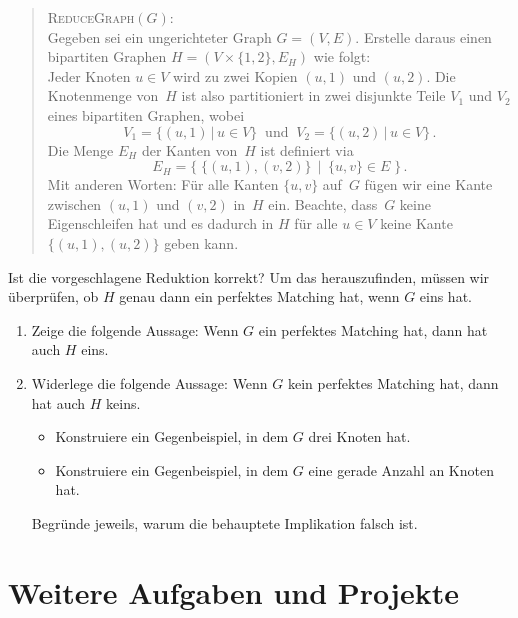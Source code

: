 \documentclass{uebung_cs}
\begin{document}
\begin{exercise}
	\begin{quote}
		\textsc{ReduceGraph}$(G)$:\\
		Gegeben sei ein ungerichteter Graph $G = (V,E)$. Erstelle daraus einen bipartiten Graphen $H = (V \times \{1,2\},E_H)$ wie folgt:\\
		Jeder Knoten $u \in V$ wird zu zwei Kopien $(u,1)$ und $(u,2)$. Die Knotenmenge von~$H$ ist also partitioniert in zwei disjunkte Teile $V_1$ und $V_2$ eines bipartiten Graphen, wobei
		\begin{equation*}
			V_1 = \{(u,1)\,|\,u\in V\}\ \text{ und }\ V_2 = \{(u,2)\,|\,u\in V\}\,.
		\end{equation*}
		Die Menge $E_H$ der Kanten von~$H$ ist definiert via
		\[E_H = \Big\{\;\{(u,1),(v,2)\}\,\;\Big|\;\,\{u,v\} \in E\;\Big\}\,.\]
		Mit anderen Worten: Für alle Kanten $\{u,v\}$ auf~$G$ fügen wir eine Kante zwischen $(u,1)$ und $(v,2)$ in~$H$ ein. Beachte, dass~$G$ keine Eigenschleifen hat und es dadurch in $H$ für alle $u \in V$ keine Kante  $\{(u,1),(u,2)\}$ geben kann.
	\end{quote}
	Ist die vorgeschlagene Reduktion korrekt? Um das herauszufinden, müssen wir überprüfen, ob $H$ genau dann ein perfektes Matching hat, wenn $G$ eins hat.
	\begin{enumerate}[resume]
		\item\medium Zeige die folgende Aussage: Wenn $G$ ein perfektes Matching hat, dann hat auch $H$ eins.
		\item\medium Widerlege die folgende Aussage: Wenn $G$ kein perfektes Matching hat, dann hat auch $H$ keins.
		      \begin{itemize}
			      \item Konstruiere ein Gegenbeispiel, in dem $G$ drei Knoten hat. 
			      \item Konstruiere ein Gegenbeispiel, in dem $G$ eine gerade Anzahl an Knoten hat.
		      \end{itemize}
			  Begründe jeweils, warum die behauptete Implikation falsch ist.
	\end{enumerate}
\end{exercise}

\clearpage
\section*{Weitere Aufgaben und Projekte}
\end{document}
